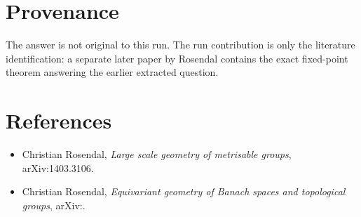 \documentclass[11pt]{article}
\begin{document}
\section*{Provenance}

The answer is not original to this run.  The run contribution is only the
literature identification: a separate later paper by Rosendal contains the
exact fixed-point theorem answering the earlier extracted question.

\section*{References}

\begin{itemize}
  \item Christian Rosendal, \emph{Large scale geometry of metrisable groups},
  arXiv:1403.3106.
  \item Christian Rosendal, \emph{Equivariant geometry of Banach spaces and
  topological groups}, arXiv:.
\end{itemize}
\end{document}
